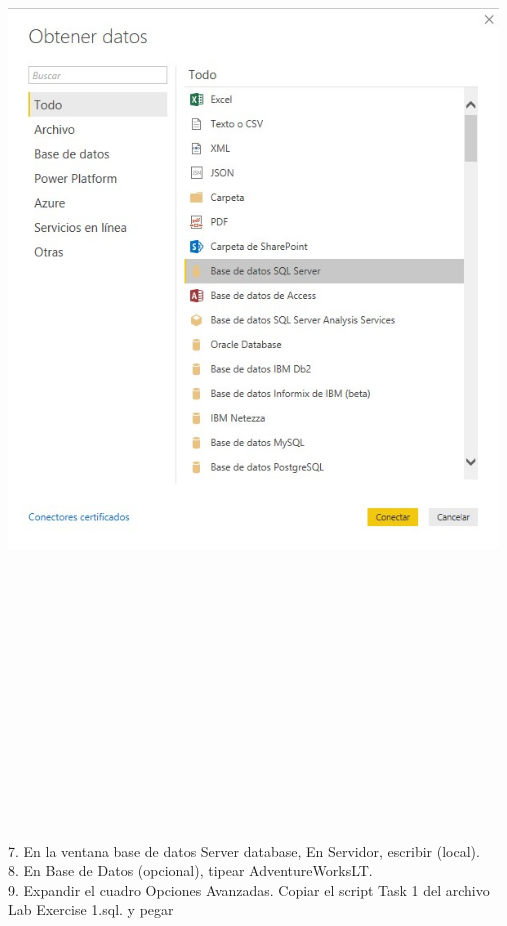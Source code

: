 \begin{flushleft}
\begin{itemize}
\textbf{ }\\
\begin{center}
	\includegraphics[width=13cm]{./Imagenes/image3} 
	\end{center}
\textbf{ }\\
\textbf{ }\\
\textbf{ }\\
\textbf{ }\\
\textbf{ }\\
\textbf{ }\\
\textbf{ }\\
\textbf{ }\\
\textbf{ }\\
\textbf{ }\\
\textbf{ }\\
\textbf{ }\\
\textbf{ }\\
\textbf{ }\\
7. En la ventana base de datos Server database, En Servidor, escribir (local).\\
8. En Base de Datos (opcional), tipear AdventureWorksLT.\\
9. Expandir el cuadro Opciones Avanzadas. Copiar el script Task 1 del archivo Lab Exercise 1.sql. y pegar\\

\end{itemize}
\end{flushleft}

